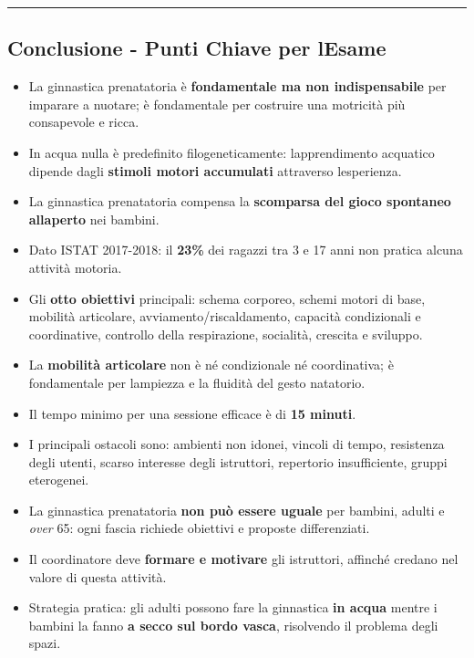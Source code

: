 \documentclass[a4paper,11pt]{article}
\providecommand{\tightlist}{%
  \setlength{\itemsep}{0pt}\setlength{\parskip}{0pt}}
\begin{document}
\begin{center}\rule{0.5\linewidth}{0.5pt}\end{center}

\subsection{Conclusione - Punti Chiave per
      l\textquotesingle Esame}\label{conclusione---punti-chiave-per-lesame-11}

\begin{itemize}
      \tightlist
      \item
            La ginnastica prenatatoria è \textbf{fondamentale ma non
                  indispensabile} per imparare a nuotare; è fondamentale per costruire
            una motricità più consapevole e ricca.
      \item
            In acqua nulla è predefinito filogeneticamente:
            l\textquotesingle apprendimento acquatico dipende dagli
            \textbf{stimoli motori accumulati} attraverso
            l\textquotesingle esperienza.
      \item
            La ginnastica prenatatoria compensa la \textbf{scomparsa del gioco
                  spontaneo all\textquotesingle aperto} nei bambini.
      \item
            Dato ISTAT 2017-2018: il \textbf{23\%} dei ragazzi tra 3 e 17 anni non
            pratica alcuna attività motoria.
      \item
            Gli \textbf{otto obiettivi} principali: schema corporeo, schemi motori
            di base, mobilità articolare, avviamento/riscaldamento, capacità
            condizionali e coordinative, controllo della respirazione, socialità,
            crescita e sviluppo.
      \item
            La \textbf{mobilità articolare} non è né condizionale né coordinativa;
            è fondamentale per l\textquotesingle ampiezza e la fluidità del gesto
            natatorio.
      \item
            Il tempo minimo per una sessione efficace è di \textbf{15 minuti}.
      \item
            I principali ostacoli sono: ambienti non idonei, vincoli di tempo,
            resistenza degli utenti, scarso interesse degli istruttori, repertorio
            insufficiente, gruppi eterogenei.
      \item
            La ginnastica prenatatoria \textbf{non può essere uguale} per bambini,
            adulti e \emph{over} 65: ogni fascia richiede obiettivi e proposte
            differenziati.
      \item
            Il coordinatore deve \textbf{formare e motivare} gli istruttori,
            affinché credano nel valore di questa attività.
      \item
            Strategia pratica: gli adulti possono fare la ginnastica \textbf{in
                  acqua} mentre i bambini la fanno \textbf{a secco sul bordo vasca},
            risolvendo il problema degli spazi.
\end{itemize}
\end{document}

